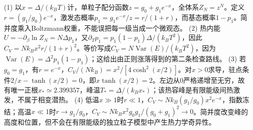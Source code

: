 (1) 以\(x=\Delta/(k_BT)\)计，单粒子配分函数\(z=g_0+g_1e^{-x}\)，全体系\(Z_N=z^N\)。定义\(r=(g_1/g_0)e^{-x}\)，激发态概率\(p_1=g_1e^{-x}/z=r/(1+r)\)，而基态概率\(1-p_1\)。简并度乘入Boltzmann权重，不能误把每一级当成一个微观态。
(2) 热内能\(U=-\partial_\beta\ln Z_N=N\Delta p_1\)，又\(\partial_Tp_1=p_1(1-p_1)\Delta/(k_BT^2)\)，因此\(C_V=Nk_Bx^2r/(1+r)^2\)。等价写成\(C_V=N\operatorname{Var}(E)/(k_BT^2)\)，因为\(\operatorname{Var}(E)=\Delta^2p_1(1-p_1)\)；这给出由正则涨落得到的第二条检查路线。
(3) 若\(g_0=g_1\)，有\(r=e^{-x}\)，\(C_V/(Nk_B)=x^2/[4\cosh^2(x/2)]\)。对\(x>0\)求导，驻点条件\(2/x-\tanh(x/2)=0\)，即\(x\tanh(x/2)=2\)。左边从0严格递增至无穷，故有唯一正根\(x_*\simeq2.399357\)，峰温\(T_*=\Delta/(k_Bx_*)\)；该热容峰是有限能级间热激发，不属于相变潜热。
(4) 低温\(x\gg1\)时\(r\ll1\)，\(C_V\sim Nk_B(g_1/g_0)x^2e^{-x}\)，指数冻结；高温\(x\ll1\)时\(r\to g_1/g_0\)，\(C_V\sim Nk_Bx^2g_0g_1/(g_0+g_1)^2\to0\)。简并度改变峰的高度和位置，但不会在有限能级的独立粒子模型中产生热力学奇异性。
